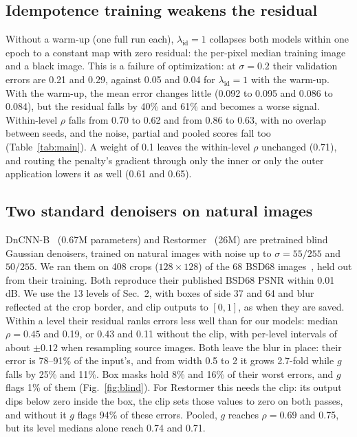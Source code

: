\documentclass[10pt,twocolumn,a4paper]{article}
\newcommand{\lid}{\lambda_{\mathrm{id}}}
\begin{document}
\subsection{Idempotence training weakens the residual}
\label{sec:idem}
Without a warm-up (one full run each), $\lid = 1$ collapses both models within one epoch to
a constant map with zero residual: the per-pixel median training image and a black image. This is a
failure of optimization: at $\sigma = 0.2$ their validation errors are 0.21 and 0.29, against 0.05
and 0.04 for $\lid = 1$ with the warm-up. With the warm-up, the mean error changes little
(0.092 to 0.095 and 0.086 to 0.084), but the residual falls by 40\% and 61\% and becomes a worse
signal. Within-level $\rho$ falls from 0.70 to 0.62 and from 0.86 to 0.63, with no overlap between
seeds, and the noise, partial and pooled scores fall too (Table~\ref{tab:main}). A weight of 0.1
leaves the within-level $\rho$ unchanged (0.71), and routing the penalty's gradient through only
the inner or only the outer application lowers it as well (0.61 and 0.65).

\subsection{Two standard denoisers on natural images}
\label{sec:standard}
\mbox{DnCNN-B}~\cite{zhang2017dncnn} (0.67M parameters) and Restormer~\cite{zamir2022restormer}
(26M) are pretrained blind Gaussian denoisers, trained on natural images with noise up to
$\sigma = 55/255$ and $50/255$. We ran them on 408 crops ($128\times128$) of the 68 BSD68
images~\cite{martin2001bsd}, held out from their training. Both reproduce their published BSD68
PSNR within 0.01 dB. We use the 13 levels of Sec.~2, with boxes of side 37 and 64 and blur
reflected at the crop border, and clip outputs to $[0, 1]$, as when they are saved. Within a level
their residual ranks errors less well than for our models: median $\rho = 0.45$ and 0.19, or 0.43
and 0.11 without the clip, with per-level intervals of about $\pm 0.12$ when resampling source
images. Both leave the blur in place: their error is
78--91\% of the input's, and from width 0.5 to 2 it grows 2.7-fold while $g$ falls by 25\% and
11\%. Box masks hold 8\% and 16\% of their worst errors, and $g$ flags 1\% of them
(Fig.~\ref{fig:blind}). For Restormer this needs the clip: its output dips below zero inside the
box, the clip sets those values to zero on both passes, and without it $g$ flags 94\% of these errors.
Pooled, $g$ reaches $\rho = 0.69$ and 0.75, but its level medians alone reach 0.74 and 0.71.
\end{document}
